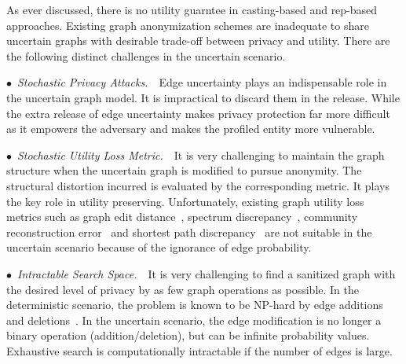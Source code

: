 As ever discussed, there is no utility guarntee in casting-based and rep-based approaches. 
Existing graph anonymization schemes are inadequate to share uncertain graphs with desirable trade-off between privacy and utility. 
There are the following distinct challenges in the uncertain scenario. 

$\bullet$~\textup{\emph{Stochastic Privacy Attacks.}}~~Edge uncertainty plays an indispensable role in the uncertain graph model. It is impractical to discard them in the release.  
While the extra release of edge uncertainty makes privacy protection far more difficult as it empowers the adversary and makes the profiled entity more vulnerable. 

$\bullet$~\textup{\emph{Stochastic Utility Loss Metric.}}~~It is very challenging to maintain the graph structure when the uncertain graph is modified to pursue anonymity. The structural distortion incurred is evaluated by the corresponding metric.  It plays the key role in utility preserving. Unfortunately, existing graph utility loss metrics such as graph edit distance~\cite{Liu_Towards_2008}, spectrum discrepancy~\cite{Ying_Randomizing_2008}, community reconstruction error~\cite{Wang2011} and shortest path discrepancy~\cite{Liu_Privacy_2009} are not suitable in the uncertain scenario because of the ignorance of edge probability. 

$\bullet$~\textup{\emph{Intractable Search Space.}}~~It is very challenging to find a sanitized graph with the desired level of privacy by as few graph operations as possible. 
In the deterministic scenario, the problem is known to be NP-hard by edge additions and deletions~\cite{Hartung_Theory_2015}. 
In the uncertain scenario, the edge modification is no longer a binary operation (addition/deletion), but can be infinite probability values. Exhaustive search is computationally intractable if the number of edges is large.

